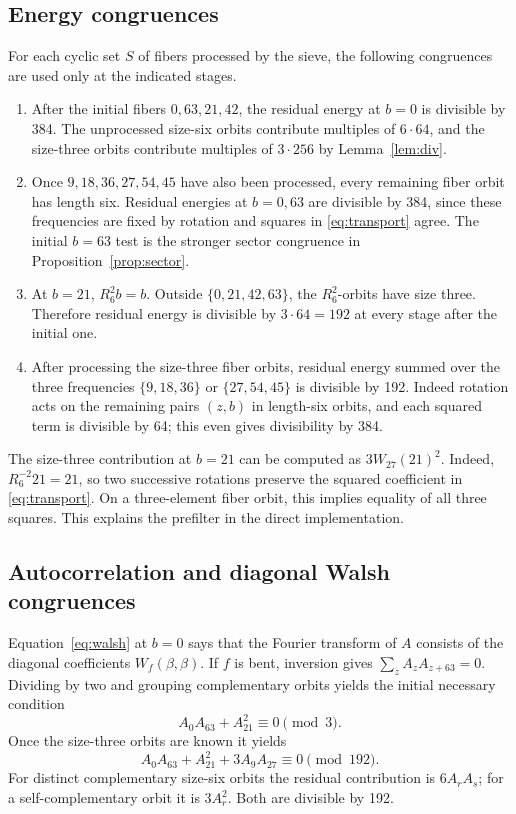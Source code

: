 \documentclass[11pt,a4paper]{article}
\begin{document}
\subsection{Energy congruences}
For each cyclic set $S$ of fibers processed by the sieve, the following
congruences are used only at the indicated stages.
\begin{enumerate}
\item After the initial fibers $0,63,21,42$, the residual energy at
$b=0$ is divisible by 384. The unprocessed size-six orbits contribute
multiples of $6\cdot64$, and the size-three orbits contribute
multiples of $3\cdot256$ by Lemma~\ref{lem:div}.
\item Once $9,18,36,27,54,45$ have also been processed, every
remaining fiber orbit has length six. Residual energies at $b=0,63$
are divisible by 384, since these frequencies are fixed by rotation
and squares in \eqref{eq:transport} agree. The initial $b=63$ test
is the stronger sector congruence in Proposition~\ref{prop:sector}.
\item At $b=21$, $R_6^2b=b$. Outside $\{0,21,42,63\}$, the
$R_6^2$-orbits have size three. Therefore residual energy is divisible
by $3\cdot64=192$ at every stage after the initial one.
\item After processing the size-three fiber orbits, residual energy
summed over the three frequencies $\{9,18,36\}$ or $\{27,54,45\}$
is divisible by 192. Indeed rotation acts on the remaining pairs
$(z,b)$ in length-six orbits, and each squared term is divisible by 64;
this even gives divisibility by 384.
\end{enumerate}
The size-three contribution at $b=21$ can be computed as $3W_{27}(21)^2$.
Indeed, $R_6^{-2}21=21$, so two successive rotations preserve the
squared coefficient in \eqref{eq:transport}. On a three-element
fiber orbit, this implies equality of all three squares.
This explains the prefilter in the direct implementation.

\subsection{Autocorrelation and diagonal Walsh congruences}
Equation~\eqref{eq:walsh} at $b=0$ says that the Fourier transform of
$A$ consists of the diagonal coefficients $W_f(\beta,\beta)$.
If $f$ is bent, inversion gives
$\sum_z A_zA_{z+63}=0$. Dividing by two and grouping complementary
orbits yields the initial necessary condition
\[
 A_0A_{63}+A_{21}^2\equiv0\pmod3.
\]
Once the size-three orbits are known it yields
\begin{equation}\label{eq:ac}
 A_0A_{63}+A_{21}^2+3A_9A_{27}\equiv0\pmod{192}.
\end{equation}
For distinct complementary size-six orbits the residual contribution
is $6A_rA_s$; for a self-complementary orbit it is $3A_r^2$.
Both are divisible by 192.
\end{document}
